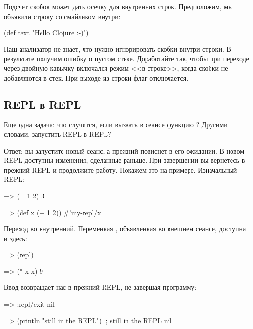 Подсчет скобок может дать осечку для внутренних строк. Предположим, мы объявили строку со смайликом внутри:

\begin{english}
  \begin{clojure}
(def text "Hello Clojure :-)")
  \end{clojure}
\end{english}

Наш анализатор не знает, что нужно игнорировать скобки внутри строки. В результате получим ошибку о пустом стеке. Доработайте  так, чтобы при переходе через двойную кавычку включался режим <<в строке>>, когда скобки не добавляются в стек. При выходе из строки флаг отключается.

\subsection{REPL в REPL}


Еще одна задача: что случится, если вызвать в сеансе функцию ? Другими словами, запустить REPL в REPL?

Ответ: вы запустите новый сеанс, а прежний повиснет в его ожидании. В новом REPL доступны изменения, сделанные раньше. При завершении вы вернетесь в прежний REPL и продолжите работу. Покажем это на примере. Изначальный REPL:

\begin{english}
  \begin{clojure/lines}
=> (+ 1 2)
3

=> (def x (+ 1 2))
#'my-repl/x
  \end{clojure/lines}
\end{english}

\pagebreaklarge

Переход во внутренний. Переменная , объявленная во внешнем сеансе, доступна и здесь:

\begin{english}
  \begin{clojure}
=> (repl)

=> (* x x)
9
  \end{clojure}
\end{english}

Ввод  возвращает нас в прежний REPL, не завершая программу:

\begin{english}
  \begin{clojure}
=> :repl/exit
nil

=> (println "still in the REPL")
;; still in the REPL
nil
  \end{clojure}
\end{english}

